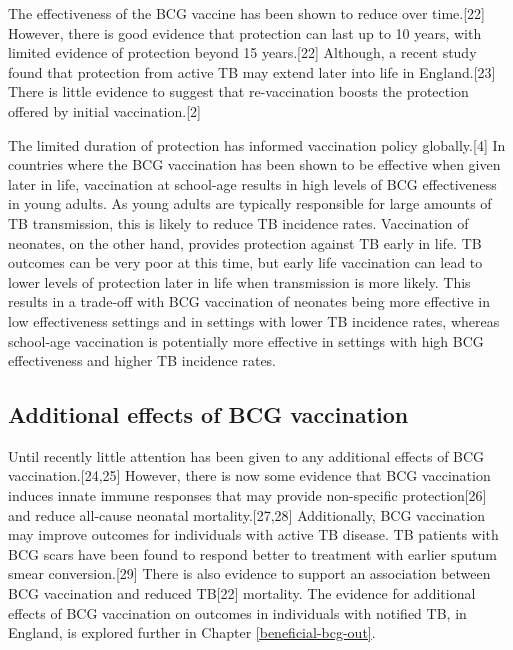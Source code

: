 \documentclass[11pt,twoside]{bristolthesis}
\begin{document}
  The effectiveness of the BCG vaccine has been shown to reduce over time.{[}22{]} However, there is good evidence that protection can last up to 10 years, with limited evidence of protection beyond 15 years.{[}22{]} Although, a recent study found that protection from active TB may extend later into life in England.{[}23{]} There is little evidence to suggest that re-vaccination boosts the protection offered by initial vaccination.{[}2{]}
  
  The limited duration of protection has informed vaccination policy globally.{[}4{]} In countries where the BCG vaccination has been shown to be effective when given later in life, vaccination at school-age results in high levels of BCG effectiveness in young adults. As young adults are typically responsible for large amounts of TB transmission, this is likely to reduce TB incidence rates. Vaccination of neonates, on the other hand, provides protection against TB early in life. TB outcomes can be very poor at this time, but early life vaccination can lead to lower levels of protection later in life when transmission is more likely. This results in a trade-off with BCG vaccination of neonates being more effective in low effectiveness settings and in settings with lower TB incidence rates, whereas school-age vaccination is potentially more effective in settings with high BCG effectiveness and higher TB incidence rates.
  
  \hypertarget{additional-effects-of-bcg-vaccination}{%
  \subsection{Additional effects of BCG vaccination}\label{additional-effects-of-bcg-vaccination}}
  
  Until recently little attention has been given to any additional effects of BCG vaccination.{[}24,25{]} However, there is now some evidence that BCG vaccination induces innate immune responses that may provide non-specific protection{[}26{]} and reduce all-cause neonatal mortality.{[}27,28{]} Additionally, BCG vaccination may improve outcomes for individuals with active TB disease. TB patients with BCG scars have been found to respond better to treatment with earlier sputum smear conversion.{[}29{]} There is also evidence to support an association between BCG vaccination and reduced TB{[}22{]} mortality. The evidence for additional effects of BCG vaccination on outcomes in individuals with notified TB, in England, is explored further in Chapter \ref{beneficial-bcg-out}.
  
\end{document}
